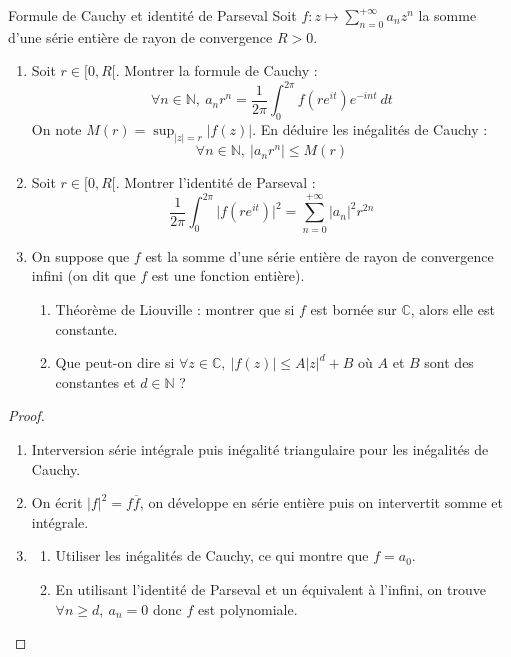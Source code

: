 \documentclass[french,a4paper]{article}
\newcommand{\N}{\mathbb{N}}
\newcommand{\C}{\mathbb{C}}
\theoremstyle{plain}
\theoremstyle{definition}
\theoremstyle{remark}
\begin{document}
\begin{ex}[Châteaux]{Formule de Cauchy et identité de Parseval}
	Soit $f:z\mapsto\displaystyle\sum_{n=0}^{+\infty}a_nz^n$ la somme d'une série entière de rayon de convergence $R>0$.
	\begin{enumerate}
		\item Soit $r\in[0,R[$. Montrer la formule de Cauchy : $$\forall n\in\N,\ a_nr^n=\frac{1}{2\pi}\int_{0}^{2\pi}f(re^{it})e^{-int}\ dt$$ On note $M(r)=\displaystyle\sup_{\lvert z\rvert=r}\lvert f(z)\rvert$. En déduire les inégalités de Cauchy : $$\forall n\in\N,\ \lvert a_nr^n\rvert\leqslant M(r)$$
		\item Soit $r\in[0,R[$. Montrer l'identité de Parseval : $$\frac{1}{2\pi}\int_{0}^{2\pi}\lvert f(re^{it})\rvert^2=\sum_{n=0}^{+\infty}\vert a_n\rvert^2r^{2n}$$
		\item On suppose que $f$ est la somme d'une série entière de rayon de convergence infini (on dit que $f$ est une fonction entière). 
		\begin{enumerate}[label=\alph*.]
			\item Théorème de Liouville : montrer que si $f$ est bornée sur $\C$, alors elle est constante.
			\item Que peut-on dire si $\forall z\in\C,\ \lvert f(z)\rvert\leqslant A\lvert z\rvert^d+B$ où $A$ et $B$ sont des constantes et $d\in\N$ ?
		\end{enumerate}
	\end{enumerate}
\end{ex}
\begin{proof}
	\begin{enumerate}
		\item Interversion série intégrale puis inégalité triangulaire pour les inégalités de Cauchy.
		\item On écrit $\lvert f\rvert^2=f\overline{f}$, on développe en série entière puis on intervertit somme et intégrale.
		\item \begin{enumerate}[label=\alph*.]
			\item Utiliser les inégalités de Cauchy, ce qui montre que $f=a_0$.
			\item En utilisant l'identité de Parseval et un équivalent à l'infini, on trouve $\forall n\geqslant d,\ a_n=0$ donc $f$ est polynomiale.
		\end{enumerate}
	\end{enumerate}
\end{proof}
\end{document}

